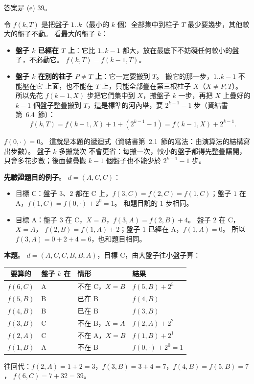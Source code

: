 \begin{pastsoln}
答案是 (e) 39。

令 $f(k, T)$ 是把盤子 $1..k$（最小的 $k$ 個）全部集中到柱子 $T$ 最少要幾步，其他較大的盤子不動。
看最大的盤子 $k$：
\begin{itemize}
\item \textbf{盤子 $k$ 已經在 $T$ 上}：它比 $1..k-1$ 都大，放在最底下不妨礙任何較小的盤子，不必動它。
$f(k, T) = f(k-1, T)$。
\item \textbf{盤子 $k$ 在別的柱子 $P \ne T$ 上}：它一定要搬到 $T$。 搬它的那一步，$1..k-1$ 不能壓在它
上面，也不能在 $T$ 上，只能全部疊在第三根柱子 $X$（$X \ne P, T$）。 所以先花 $f(k-1, X)$ 步把它們集中到
$X$，搬盤子 $k$ 一步，再把 $X$ 上疊好的 $k - 1$ 個盤子整疊搬到 $T$，這是標準的河內塔，要
$2^{k-1} - 1$ 步（資結書第~6.4~節）：
\[
f(k, T) = f(k-1, X) + 1 + (2^{k-1} - 1) = f(k-1, X) + 2^{k-1}.
\]
\end{itemize}
$f(0, \cdot) = 0$。 這就是本題的遞迴式（資結書第~2.1~節的寫法：由演算法的結構寫出步數）。 盤子 $k$ 多搬幾次
不會更省：每搬一次，較小的盤子都得先整疊讓開，只會多花步數；後面整疊搬 $k - 1$ 個盤子也不能少於
$2^{k-1} - 1$ 步。

\textbf{先驗證題目的例子}。 $d = (A, C, C)$：
\begin{itemize}
\item 目標 C：盤子 $3$、$2$ 都在 C 上，$f(3, C) = f(2, C) = f(1, C)$；盤子 $1$ 在 A，$f(1, C) = f(0, \cdot) + 2^0 = 1$。 和題目說的 $1$ 步相同。
\item 目標 A：盤子 $3$ 在 C，$X = B$，$f(3, A) = f(2, B) + 4$。 盤子 $2$ 在 C，$X = A$，
$f(2, B) = f(1, A) + 2$；盤子 $1$ 已經在 A，$f(1, A) = 0$。 所以 $f(3, A) = 0 + 2 + 4 = 6$，也和題目相同。
\end{itemize}

\textbf{本題}。 $d = (A, C, C, B, B, A)$，目標 C，由大盤子往小盤子算：
\begin{center}
\begin{tabular}{clll}
\toprule
要算的 & 盤子 $k$ 在 & 情形 & 結果 \\
\midrule
$f(6, C)$ & A & 不在 C，$X = B$ & $f(5, B) + 2^5$ \\
$f(5, B)$ & B & 已在 B & $f(4, B)$ \\
$f(4, B)$ & B & 已在 B & $f(3, B)$ \\
$f(3, B)$ & C & 不在 B，$X = A$ & $f(2, A) + 2^2$ \\
$f(2, A)$ & C & 不在 A，$X = B$ & $f(1, B) + 2^1$ \\
$f(1, B)$ & A & 不在 B & $f(0, \cdot) + 2^0 = 1$ \\
\bottomrule
\end{tabular}
\end{center}
往回代：$f(2, A) = 1 + 2 = 3$，$f(3, B) = 3 + 4 = 7$，$f(4, B) = f(5, B) = 7$，
$f(6, C) = 7 + 32 = 39$。


\end{pastsoln}
